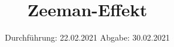 

\subject{Nr. 27}
\title{Zeeman-Effekt}
\date{%
  Durchführung: 22.02.2021
  \hspace{3em}
  Abgabe: 30.02.2021
}



\maketitle
\thispagestyle{empty}
\tableofcontents
\newpage






\printbibliography{}


